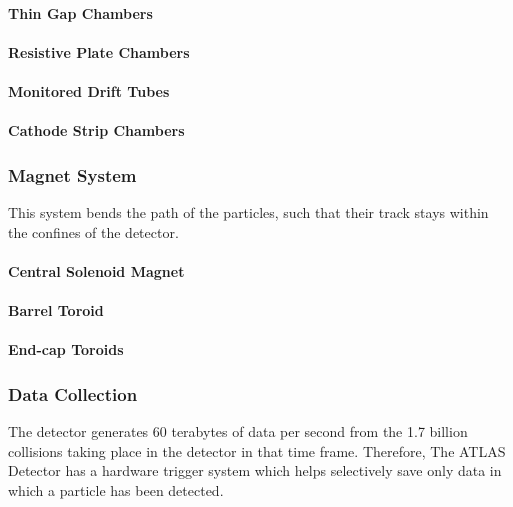 \documentclass[11pt,a4paper]{article}
\begin{document}
\paragraph{Thin Gap Chambers}
\paragraph{Resistive Plate Chambers}
\paragraph{Monitored Drift Tubes}
\paragraph{Cathode Strip Chambers}

\subsubsection{Magnet System}
This system bends the path of the particles, such that their track stays within
the confines of the detector.

\paragraph{Central Solenoid Magnet}
\paragraph{Barrel Toroid}
\paragraph{End-cap Toroids}

\subsubsection{Data Collection}
The detector generates 60 terabytes of data per second from the 1.7 billion
collisions taking place in the detector in that time frame. Therefore, The ATLAS
Detector has a hardware trigger system which helps selectively save only data in
which a particle has been detected.
\end{document}
